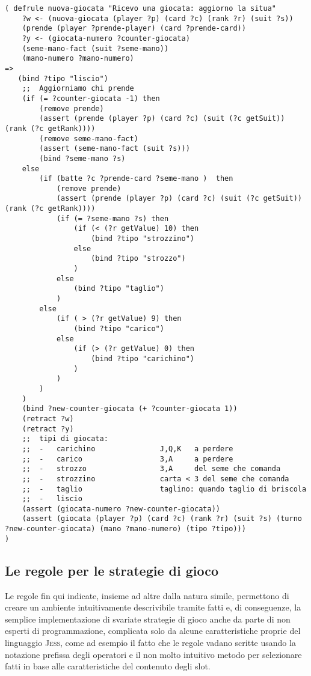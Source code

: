 \begin{lstlisting}[caption={Regola che analizza una nuova giocata ricevuta, la classifica e aggiorna alcuni fatti temporanei},label=nuovagiocata]
   ( defrule nuova-giocata "Ricevo una giocata: aggiorno la situa"
    ?w <- (nuova-giocata (player ?p) (card ?c) (rank ?r) (suit ?s))
    (prende (player ?prende-player) (card ?prende-card))
    ?y <- (giocata-numero ?counter-giocata)
    (seme-mano-fact (suit ?seme-mano))
    (mano-numero ?mano-numero)
=>
   (bind ?tipo "liscio") 
    ;;  Aggiorniamo chi prende
    (if (= ?counter-giocata -1) then
        (remove prende)
        (assert (prende (player ?p) (card ?c) (suit (?c getSuit)) (rank (?c getRank))))
        (remove seme-mano-fact)
        (assert (seme-mano-fact (suit ?s)))
        (bind ?seme-mano ?s)
    else
        (if (batte ?c ?prende-card ?seme-mano )  then
            (remove prende)
            (assert (prende (player ?p) (card ?c) (suit (?c getSuit)) (rank (?c getRank))))
            (if (= ?seme-mano ?s) then
                (if (< (?r getValue) 10) then
                    (bind ?tipo "strozzino")
                else
                    (bind ?tipo "strozzo")
                )
            else
                (bind ?tipo "taglio")
            )
        else
            (if ( > (?r getValue) 9) then
                (bind ?tipo "carico")
            else
                (if (> (?r getValue) 0) then
                    (bind ?tipo "carichino")
                )
            )
        )
    )
    (bind ?new-counter-giocata (+ ?counter-giocata 1))
    (retract ?w)
    (retract ?y)
    ;;  tipi di giocata:
    ;;  -   carichino               J,Q,K   a perdere
    ;;  -   carico                  3,A     a perdere
    ;;  -   strozzo                 3,A     del seme che comanda
    ;;  -   strozzino               carta < 3 del seme che comanda
    ;;  -   taglio                  taglino: quando taglio di briscola
    ;;  -   liscio
    (assert (giocata-numero ?new-counter-giocata))
    (assert (giocata (player ?p) (card ?c) (rank ?r) (suit ?s) (turno ?new-counter-giocata) (mano ?mano-numero) (tipo ?tipo)))
)
\end{lstlisting} 


\subsection{Le regole per le strategie di gioco}

Le regole fin qui indicate, insieme ad altre dalla natura simile, permettono di creare un ambiente intuitivamente descrivibile tramite fatti e, di conseguenze, la semplice implementazione di svariate strategie di gioco anche da parte di non esperti di programmazione, complicata solo da alcune caratteristiche proprie del linguaggio \textsc{Jess}, come ad esempio il fatto che le regole vadano scritte usando la notazione prefissa degli operatori e il non molto intuitivo metodo per selezionare fatti in base alle caratteristiche del contenuto degli slot.\\



